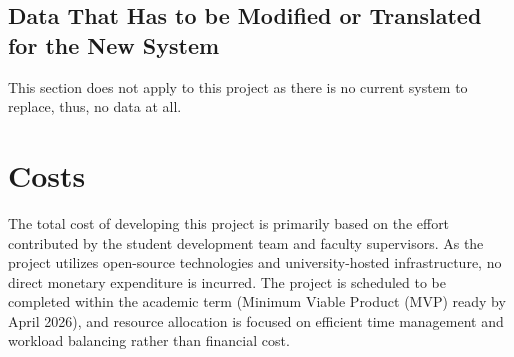 \documentclass[12pt]{article}
\begin{document}
\subsection{Data That Has to be Modified or Translated for the New System}
This section does not apply to this project as there is no current
system to replace, thus, no data at all.

\section{Costs}

The total cost of developing this project is primarily based on the effort contributed by the student development team and faculty supervisors. As the project utilizes open-source technologies and university-hosted infrastructure, no direct monetary expenditure is incurred. The project is scheduled to be completed within the academic term (Minimum Viable Product (MVP) ready by April 2026), and resource allocation is focused on efficient time management and workload balancing rather than financial cost.
\end{document}
